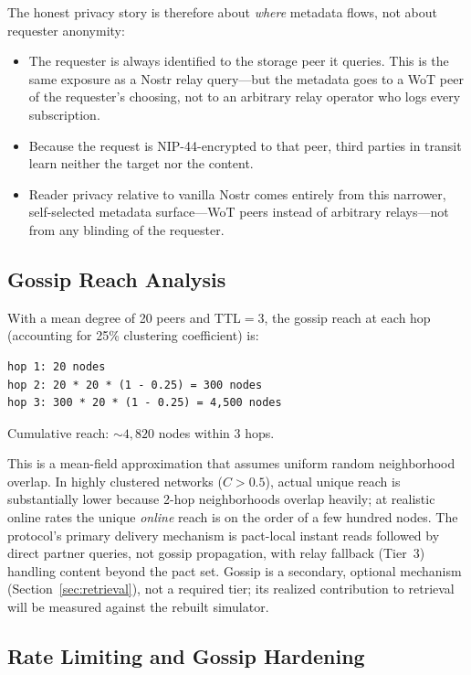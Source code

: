 \documentclass[11pt,a4paper]{article}
\begin{document}
The honest privacy story is therefore about \emph{where} metadata flows, not about requester anonymity:

\begin{itemize}
  \item The requester is always identified to the storage peer it queries. This is the same exposure as a Nostr relay query---but the metadata goes to a WoT peer of the requester's choosing, not to an arbitrary relay operator who logs every subscription.
  \item Because the request is NIP-44-encrypted to that peer, third parties in transit learn neither the target nor the content.
  \item Reader privacy relative to vanilla Nostr comes entirely from this narrower, self-selected metadata surface---WoT peers instead of arbitrary relays---not from any blinding of the requester.
\end{itemize}

\subsection{Gossip Reach Analysis}

With a mean degree of 20 peers and TTL$=$3, the gossip reach at each hop (accounting for 25\% clustering coefficient) is:

\begin{lstlisting}
hop 1: 20 nodes
hop 2: 20 * 20 * (1 - 0.25) = 300 nodes
hop 3: 300 * 20 * (1 - 0.25) = 4,500 nodes
\end{lstlisting}

Cumulative reach: ${\sim}4{,}820$ nodes within 3 hops.

This is a mean-field approximation that assumes uniform random neighborhood overlap. In highly clustered networks ($C > 0.5$), actual unique reach is substantially lower because 2-hop neighborhoods overlap heavily; at realistic online rates the unique \emph{online} reach is on the order of a few hundred nodes. The protocol's primary delivery mechanism is pact-local instant reads followed by direct partner queries, not gossip propagation, with relay fallback (Tier~3) handling content beyond the pact set. Gossip is a secondary, optional mechanism (Section~\ref{sec:retrieval}), not a required tier; its realized contribution to retrieval will be measured against the rebuilt simulator.

\subsection{Rate Limiting and Gossip Hardening}
\end{document}

